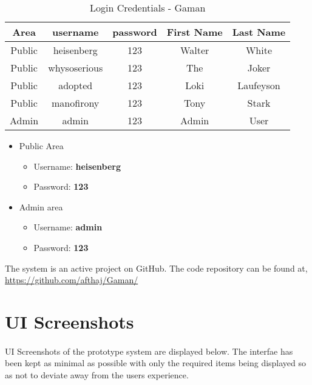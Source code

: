 \begin{table} [H]
\centering
\begin{tabular}{|c|c|c|c|c|}
\hline
Area &username &password &First Name &Last Name \\
\hline
Public	&heisenberg	&123	&Walter	&White \\
\hline
Public	&whysoserious	&123	&The	&Joker \\
\hline
Public	&adopted	&123	&Loki	&Laufeyson \\
\hline
Public	&manofirony	&123	&Tony	&Stark \\
\hline
Admin	&admin	&123	&Admin	&User \\
\hline
\end{tabular}
\caption{Login Credentials - Gaman}
\label{table-loginCredentials}
\end{table}

\begin {itemize}

\item Public Area
\begin {itemize}
\item Username: \textbf{heisenberg}
\item Password: \textbf{123}
\end {itemize}

\item Admin area
\begin {itemize}
\item Username: \textbf{admin}
\item Password: \textbf{123}
\end {itemize}

\end {itemize}

The system is an active project on GitHub. The code repository can be found at, \url{https://github.com/afthaj/Gaman/}



\section{UI Screenshots}

\paragraph{} UI Screenshots of the prototype system are displayed below. The interfae has been kept as minimal as possible with only the required items being displayed so as not to deviate away from the users experience.

